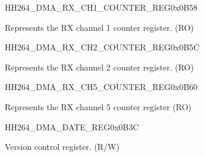     
    \begin{register}{H}{H264\_DMA\_RX\_CH1\_COUNTER\_REG}{0x0B58}\label{regdesc:H264DMARXCH1COUNTERREG}
    \regnewline%
    \begin{regdesc}\begin{reglist}
    \label{fielddesc:H264DMARXCH1CNT}\item [H264\_DMA\_RX\_CH1\_CNT] Represents the RX channel 1 counter register. (RO)
    \end{reglist}\end{regdesc}
    \end{register}
    
    
    \begin{register}{H}{H264\_DMA\_RX\_CH2\_COUNTER\_REG}{0x0B5C}\label{regdesc:H264DMARXCH2COUNTERREG}
    \regnewline%
    \begin{regdesc}\begin{reglist}
    \label{fielddesc:H264DMARXCH2CNT}\item [H264\_DMA\_RX\_CH2\_CNT] Represents the RX channel 2 counter register. (RO)
    \end{reglist}\end{regdesc}
    \end{register}
    
    
    \begin{register}{H}{H264\_DMA\_RX\_CH5\_COUNTER\_REG}{0x0B60}\label{regdesc:H264DMARXCH5COUNTERREG}
    \regnewline%
    \begin{regdesc}\begin{reglist}
    \label{fielddesc:H264DMARXCH5CNT}\item [H264\_DMA\_RX\_CH5\_CNT] Represents the RX channel 5 counter register (RO)
    \end{reglist}\end{regdesc}
    \end{register}
    
    \begin{register}{H}{H264\_DMA\_DATE\_REG}{0x0B3C}\label{regdesc:H264DMADATEREG}
    \regnewline%
    \begin{regdesc}\begin{reglist}
    \label{fielddesc:H264DMADATE}\item [H264\_DMA\_DATE] Version control register. (R/W)
    \end{reglist}\end{regdesc}
    \end{register}
